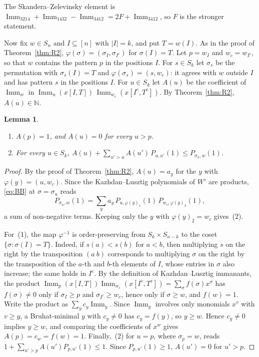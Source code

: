 \documentclass[11pt]{amsart}
\newtheorem{lemma}[theorem]{Lemma}
\theoremstyle{definition}
\theoremstyle{remark}
\newcommand{\N}{\mathbb{N}}
\newcommand{\Imm}{\operatorname{Imm}}
\begin{document}
The Skandera--Zelevinsky element is $\Imm_{3214}+\Imm_{1432}-\Imm_{3412}=2F+\Imm_{3412}$, so $F$ is the stronger statement.

Now fix $w\in S_n$ and $I\subseteq[n]$ with $|I|=k$, and put $T=w(I)$. As in the proof of Theorem~\ref{thm:R2}, $\varphi(\sigma)=(\sigma_I,\sigma_{I^c})$ for $\sigma(I)=T$. Let $p=w_I$ and $w_c=w_{I^c}$, so that $w$ contains the pattern $p$ in the positions $I$. For $s\in S_k$ let $\sigma_s$ be the permutation with $\sigma_s(I)=T$ and $\varphi(\sigma_s)=(s,w_c)$: it agrees with $w$ outside $I$ and has pattern $s$ in the positions $I$. For $u\in S_k$ let $A(u)$ be the coefficient of $\Imm_w$ in $\Imm_u(x[I,T])\,\Imm_{w_c}(x[I^c,T^c])$. By Theorem~\ref{thm:R2}, $A(u)\in\N$.

\begin{lemma}\label{lem:lift}
\begin{enumerate}
\item $A(p)=1$, and $A(u)=0$ for every $u>p$.
\item For every $u\in S_k$, $A(u)+\sum_{u'>u}A(u')\,P_{u,u'}(1)\le P_{\sigma_u,w}(1)$.
\end{enumerate}
\end{lemma}

\begin{proof}
By the proof of Theorem~\ref{thm:R2}, $A(u)=a_y$ for the $y$ with $\varphi(y)=(u,w_c)$. Since the Kazhdan--Lusztig polynomials of $W'$ are products, \eqref{eq:BB} at $\sigma=\sigma_u$ reads
\[
P_{\sigma_u,w}(1)=\sum_ya_y\,P_{u,\varphi(y)_1}(1)\,P_{w_c,\varphi(y)_2}(1),
\]
a sum of non-negative terms. Keeping only the $y$ with $\varphi(y)_2=w_c$ gives~(2).

For~(1), the map $\varphi^{-1}$ is order-preserving from $S_k\times S_{n-k}$ to the coset $\{\sigma:\sigma(I)=T\}$. Indeed, if $s(a)<s(b)$ for $a<b$, then multiplying $s$ on the right by the transposition $(a\ b)$ corresponds to multiplying $\sigma$ on the right by the transposition of the $a$-th and $b$-th elements of $I$, whose entries in $\sigma$ also increase; the same holds in $I^c$. By the definition of Kazhdan--Lusztig immanants, the product $\Imm_p(x[I,T])\Imm_{w_c}(x[I^c,T^c])=\sum_\sigma f(\sigma)x^\sigma$ has $f(\sigma)\ne0$ only if $\sigma_I\ge p$ and $\sigma_{I^c}\ge w_c$, hence only if $\sigma\ge w$, and $f(w)=1$. Write the product as $\sum_yc_y\Imm_y$. Since $\Imm_y$ involves only monomials $x^v$ with $v\ge y$, a Bruhat-minimal $y$ with $c_y\ne0$ has $c_y=f(y)$, so $y\ge w$. Hence $c_y\ne0$ implies $y\ge w$, and comparing the coefficients of $x^w$ gives $A(p)=c_w=f(w)=1$. Finally,~(2) for $u=p$, where $\sigma_p=w$, reads $1+\sum_{u'>p}A(u')P_{p,u'}(1)\le1$. Since $P_{p,u'}(1)\ge1$, $A(u')=0$ for $u'>p$.
\end{proof}
\end{document}
